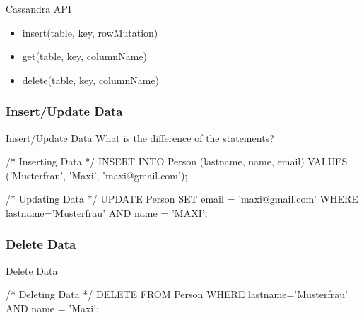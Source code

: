 \documentclass[
  10pt
]{beamer}
\begin{document}
\begin{frame}{Cassandra API \cite{cassandra_paper}}
  \begin{itemize}
    \item insert(table, key, rowMutation) \\
    \item get(table, key, columnName) \\
    \item delete(table, key, columnName) \\
  \end{itemize}
\end{frame}

\subsubsection{Insert/Update Data}
\begin{frame}[fragile]{Insert/Update Data \cite{cqlAlexMeng, newInCQL3}} %
  What is the difference of the statements?
  \begin{semiverbatim}
/* Inserting Data */
INSERT INTO Person (lastname, name, email)
VALUES ('Musterfrau', 'Maxi', 'maxi@gmail.com');

/* Updating Data */
UPDATE Person SET email = 'maxi@gmail.com'
WHERE lastname='Musterfrau' AND name = 'MAXI';
  \end{semiverbatim}
\end{frame}

\subsubsection{Delete Data}
\begin{frame}[fragile]{Delete Data \cite{cqlAlexMeng}}
  \begin{semiverbatim}
/* Deleting Data */
DELETE FROM Person
  WHERE lastname='Musterfrau' AND name = 'Maxi';
  \end{semiverbatim}
\end{frame}
\end{document}
